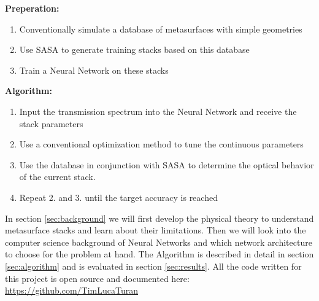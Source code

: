 \textbf{Preperation:}
\begin{enumerate}
    \item Conventionally simulate a database of metasurfaces with simple geometries

    \item Use SASA to generate training stacks based on this database

    \item Train a Neural Network on these stacks
\end{enumerate}

\textbf{Algorithm:}
\begin{enumerate}
    \item Input the transmission spectrum into the Neural Network and receive the stack parameters

    \item Use a conventional optimization method to tune the continuous parameters

    \item Use the database in conjunction with SASA to determine the optical behavior of the current stack.

    \item Repeat 2. and 3. until the target accuracy is reached
\end{enumerate}

\newpage

In section \ref{sec:background} we will first develop the physical theory to understand metasurface stacks and learn about their limitations. Then we will look into the computer science background of Neural Networks and which network architecture to choose for the problem at hand. The Algorithm is described in detail in section \ref{sec:algorithm} and is evaluated in section \ref{sec:results}.
All the code written for this project is open source and documented here: \url{https://github.com/TimLucaTuran}
